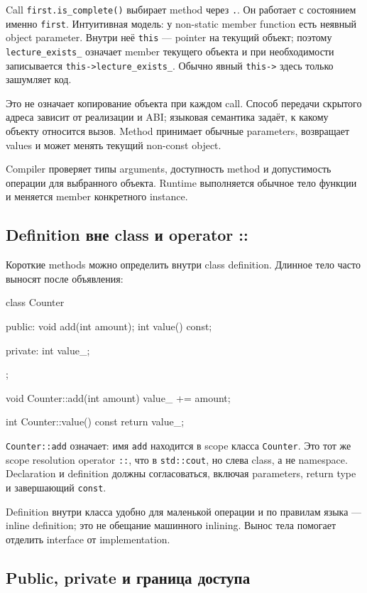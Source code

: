 Call \texttt{first.is\_complete()} выбирает method через \texttt{.}. Он
работает с состоянием именно \texttt{first}. Интуитивная модель: у non-static
member function есть неявный object parameter. Внутри неё \texttt{this} ---
pointer на текущий объект; поэтому \texttt{lecture\_exists\_} означает member
текущего объекта и при необходимости записывается
\texttt{this->lecture\_exists\_}. Обычно явный \texttt{this->} здесь только
зашумляет код.

Это не означает копирование объекта при каждом call. Способ передачи скрытого
адреса зависит от реализации и ABI; языковая семантика задаёт, к какому
объекту относится вызов. Method принимает обычные parameters, возвращает
values и может менять текущий non-const object.

Compiler проверяет типы arguments, доступность method и допустимость операции
для выбранного объекта. Runtime выполняется обычное тело функции и меняется
member конкретного instance.

\subsection{Definition вне class и operator ::}

Короткие methods можно определить внутри class definition. Длинное тело часто
выносят после объявления:

\begin{cppcode}
class Counter {
public:
    void add(int amount);
    int value() const;

private:
    int value_{};
};

void Counter::add(int amount) {
    value_ += amount;
}

int Counter::value() const {
    return value_;
}
\end{cppcode}

\texttt{Counter::add} означает: имя \texttt{add} находится в scope класса
\texttt{Counter}. Это тот же scope resolution operator \texttt{::}, что в
\texttt{std::cout}, но слева class, а не namespace. Declaration и definition
должны согласоваться, включая parameters, return type и завершающий
\texttt{const}.

Definition внутри класса удобно для маленькой операции и по правилам языка
--- inline definition; это не обещание машинного inlining. Вынос тела
помогает отделить interface от implementation.

\subsection{Public, private и граница доступа}

